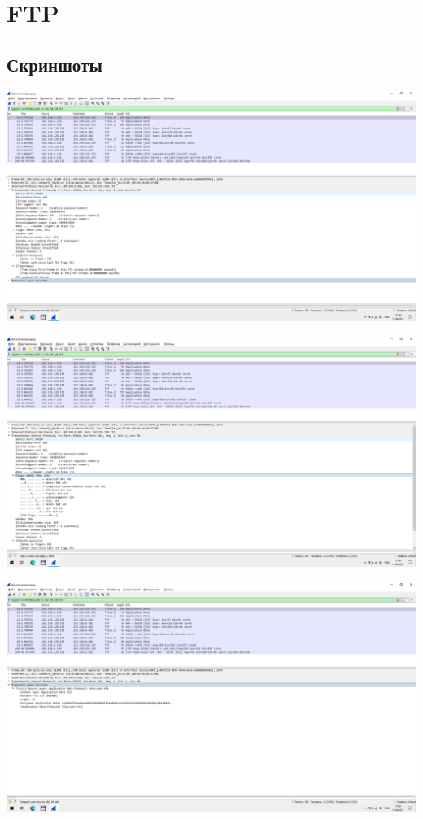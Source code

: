 \usepackage{hyperref}
\section{FTP}

\subsection{Скриншоты}

\begin{center}

    \includegraphics[width=\textwidth]{screenshots/discord_send_1}

    \includegraphics[width=\textwidth]{screenshots/discord_send_2}

    \includegraphics[width=\textwidth]{screenshots/discord_send_3}


\end{center}
